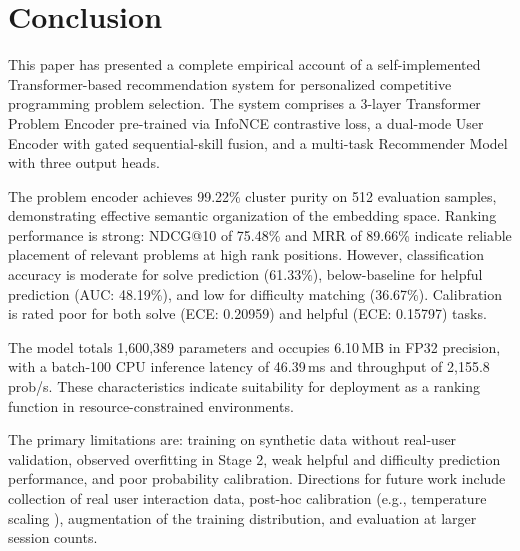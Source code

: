 \documentclass[12pt]{article}
\begin{document}
\section{Conclusion}

This paper has presented a complete empirical account of a self-implemented Transformer-based recommendation system for personalized competitive programming problem selection. The system comprises a 3-layer Transformer Problem Encoder pre-trained via InfoNCE contrastive loss, a dual-mode User Encoder with gated sequential-skill fusion, and a multi-task Recommender Model with three output heads.

The problem encoder achieves 99.22\% cluster purity on 512 evaluation samples, demonstrating effective semantic organization of the embedding space. Ranking performance is strong: NDCG@10 of 75.48\% and MRR of 89.66\% indicate reliable placement of relevant problems at high rank positions. However, classification accuracy is moderate for solve prediction (61.33\%), below-baseline for helpful prediction (AUC: 48.19\%), and low for difficulty matching (36.67\%). Calibration is rated poor for both solve (ECE: 0.20959) and helpful (ECE: 0.15797) tasks.

The model totals 1,600,389 parameters and occupies 6.10\,MB in FP32 precision, with a batch-100 CPU inference latency of 46.39\,ms and throughput of 2,155.8\,prob/s. These characteristics indicate suitability for deployment as a ranking function in resource-constrained environments.

The primary limitations are: training on synthetic data without real-user validation, observed overfitting in Stage 2, weak helpful and difficulty prediction performance, and poor probability calibration. Directions for future work include collection of real user interaction data, post-hoc calibration (e.g., temperature scaling \cite{guo2017calibration}), augmentation of the training distribution, and evaluation at larger session counts.
\end{document}
